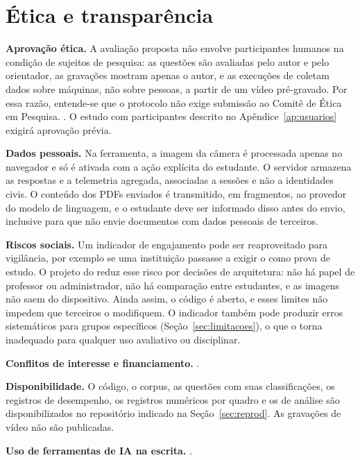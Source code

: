 \section{\label{sec:etica}Ética e transparência}

\textbf{Aprovação ética.} A avaliação proposta não envolve participantes humanos na condição de sujeitos de pesquisa: as questões são avaliadas pelo autor e pelo orientador, as gravações mostram apenas o autor, e as execuções de  coletam dados sobre máquinas, não sobre pessoas, a partir de um vídeo pré-gravado. Por essa razão, entende-se que o protocolo não exige submissão ao Comitê de Ética em Pesquisa. . O estudo com participantes descrito no Apêndice~\ref{ap:usuarios} exigirá aprovação prévia.

\textbf{Dados pessoais.} Na ferramenta, a imagem da câmera é processada apenas no navegador e só é ativada com a ação explícita do estudante. O servidor armazena as respostas e a telemetria agregada, associadas a sessões e não a identidades civis. O conteúdo dos PDFs enviados é transmitido, em fragmentos, ao provedor do modelo de linguagem, e o estudante deve ser informado disso antes do envio, inclusive para que não envie documentos com dados pessoais de terceiros.

\textbf{Riscos sociais.} Um indicador de engajamento pode ser reaproveitado para vigilância, por exemplo se uma instituição passasse a exigir o \fs como prova de estudo. O projeto do \ferramenta reduz esse risco por decisões de arquitetura: não há papel de professor ou administrador, não há comparação entre estudantes, e as imagens não saem do dispositivo. Ainda assim, o código é aberto, e esses limites não impedem que terceiros o modifiquem. O indicador também pode produzir erros sistemáticos para grupos específicos (Seção~\ref{sec:limitacoes}), o que o torna inadequado para qualquer uso avaliativo ou disciplinar.

\textbf{Conflitos de interesse e financiamento.} .

\textbf{Disponibilidade.} O código, o corpus, as questões com suas classificações, os registros de desempenho, os registros numéricos por quadro e os  de análise são disponibilizados no repositório indicado na Seção~\ref{sec:reprod}. As gravações de vídeo não são publicadas.

\textbf{Uso de ferramentas de IA na escrita.} .
